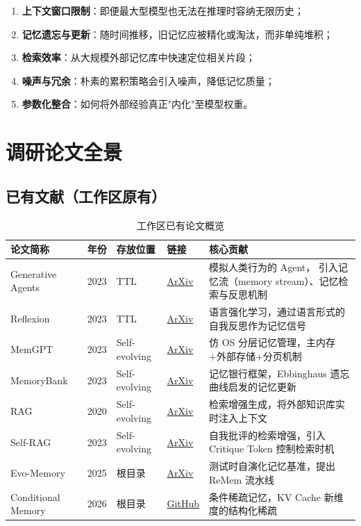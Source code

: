 \documentclass[11pt,a4paper]{article}
\begin{document}
\begin{enumerate}
  \item \textbf{上下文窗口限制}：即便最大型模型也无法在推理时容纳无限历史；
  \item \textbf{记忆遗忘与更新}：随时间推移，旧记忆应被精化或淘汰，而非单纯堆积；
  \item \textbf{检索效率}：从大规模外部记忆库中快速定位相关片段；
  \item \textbf{噪声与冗余}：朴素的累积策略会引入噪声，降低记忆质量；
  \item \textbf{参数化整合}：如何将外部经验真正"内化"至模型权重。
\end{enumerate}

\section{调研论文全景}

\subsection{已有文献（工作区原有）}

\begin{table}[h!]
\centering
\caption{工作区已有论文概览}
\label{tab:existing}
\renewcommand{\arraystretch}{1.3}
\begin{tabular}{llllp{5.5cm}}
\toprule
\textbf{论文简称} & \textbf{年份} & \textbf{存放位置} & \textbf{链接} & \textbf{核心贡献} \\
\midrule
Generative Agents & 2023 & TTL & \href{https://arxiv.org/abs/2304.03442}{ArXiv} & 模拟人类行为的 Agent，
  引入记忆流（memory stream）、记忆检索与反思机制 \\
Reflexion & 2023 & TTL & \href{https://arxiv.org/abs/2303.11366}{ArXiv} & 语言强化学习，通过语言形式的自我反思作为记忆信号 \\
MemGPT & 2023 & Self-evolving & \href{https://arxiv.org/abs/2310.08560}{ArXiv} & 仿 OS 分层记忆管理，主内存+外部存储+分页机制 \\
MemoryBank & 2023 & Self-evolving & \href{https://arxiv.org/abs/2305.10250}{ArXiv} & 记忆银行框架，Ebbinghaus 遗忘曲线启发的记忆更新 \\
RAG & 2020 & Self-evolving & \href{https://arxiv.org/abs/2005.11401}{ArXiv} & 检索增强生成，将外部知识库实时注入上下文 \\
Self-RAG & 2023 & Self-evolving & \href{https://arxiv.org/abs/2310.11511}{ArXiv} & 自我批评的检索增强，引入 Critique Token 控制检索时机 \\
Evo-Memory & 2025 & 根目录 & \href{https://arxiv.org/abs/2511.20857}{ArXiv} & 测试时自演化记忆基准，提出 ReMem 流水线 \\
Conditional Memory & 2026 & 根目录 & \href{https://github.com/deepseek-ai/Engram}{GitHub} & 条件稀疏记忆，KV Cache 新维度的结构化稀疏 \\
\bottomrule
\end{tabular}
\end{table}
\end{document}
